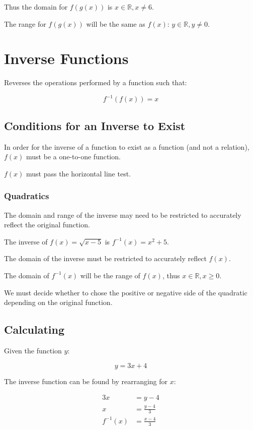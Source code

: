 \documentclass[a4paper,11pt]{article}
\begin{document}
Thus the domain for $f(g(x))$ is $x \in \mathbb{R}, x \neq 6$.

The range for $f(g(x))$ will be the same as $f(x)$:
$y \in \mathbb{R}, y \neq 0$.




\section{Inverse Functions}

Reverses the operations performed by a function such that:

$$
f^{-1}(f(x)) = x
$$


\subsection{Conditions for an Inverse to Exist}

In order for the inverse of a function to exist as a function (and not a
relation), $f(x)$ must be a one-to-one function.

$f(x)$ must pass the horizontal line test.


\subsubsection{Quadratics}

The domain and range of the inverse may need to be restricted to accurately
reflect the original function.

The inverse of $f(x) = \sqrt{x - 5}$ is $f^{-1}(x) = x^2 + 5$.

The domain of the inverse must be restricted to accurately reflect $f(x)$.

The domain of $f^{-1}(x)$ will be the range of $f(x)$, thus
$x \in \mathbb{R}, x \geq 0$.

We must decide whether to chose the positive or negative side of the quadratic
depending on the original function.


\subsection{Calculating}

Given the function $y$:

$$
y = 3x + 4
$$

The inverse function can be found by rearranging for $x$:

$$
\begin{aligned}
3x & = y - 4 \\
x & = \frac{y - 4}{3} \\
f^{-1}(x) & = \frac{x - 4}{3} \\
\end{aligned}
$$
\end{document}
